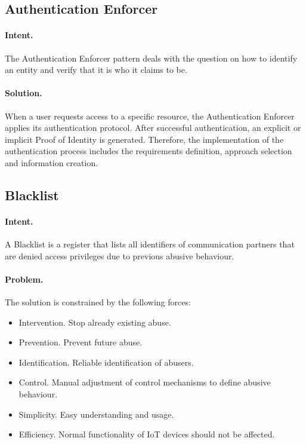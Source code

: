 \subsection{Authentication Enforcer~\cite{Papoutsakis2021}} 
\label{p:ace}

\paragraph{\textbf{Intent.}} The Authentication Enforcer pattern deals with the question on how to identify an entity and verify that it is who it claims to be.

\paragraph{\textbf{Solution.}} When a user requests access to a specific resource, the Authentication Enforcer applies its authentication protocol. After successful authentication, an explicit or implicit Proof of Identity is generated. Therefore, the implementation of the authentication process includes the requirements definition, approach selection and information creation.


\subsection{Blacklist~\cite{Reinfurt20172, Papoutsakis2021}} 
\label{p:black}

\paragraph{\textbf{Intent.}} A Blacklist is a register that lists all identifiers of communication partners that are denied access privileges due to previous abusive behaviour.

\paragraph{\textbf{Problem.}} The solution is constrained by the following forces:
\begin{itemize}
	\item Intervention. Stop already existing abuse.
	\item Prevention. Prevent future abuse.
	\item Identification. Reliable identification of abusers.
	\item Control. Manual adjustment of control mechanisms to define abusive behaviour.
	\item Simplicity. Easy understanding and usage.
	\item Efficiency. Normal functionality of IoT devices should not be affected.
\end{itemize}

